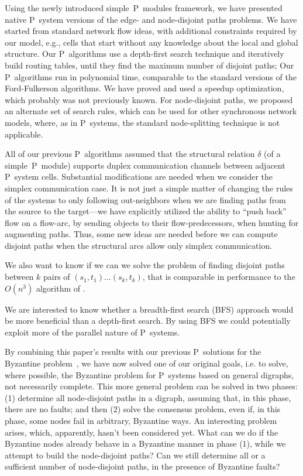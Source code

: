 \documentclass[preliminary,copyright,creativecommons]{eptcs}
\theoremstyle{remark}
\begin{document}
Using the newly introduced simple~P~modules framework,
we have presented native P~system versions 
of the edge- and node-disjoint paths problems.
We have started from standard network flow ideas,
with additional constraints required by our model,
e.g., cells that start without any knowledge about the local and global structure. 
Our P~algorithms use a depth-first search technique
and iteratively build routing tables, 
until they find the maximum number of disjoint paths;
Our P~algorithms run in polynomial time, 
comparable to the standard versions of the Ford-Fulkerson algorithms.   
We have proved and used a speedup optimization,
which probably was not previously known.
For node-disjoint paths, we proposed an alternate set of search rules, 
which can be used for other synchronous network models, where, as in P~systems, 
the standard node-splitting technique is not applicable.

All of our previous P~algorithms assumed that the structural relation $\delta$ 
(of a simple~P~module) 
supports duplex communication channels between adjacent P~system cells.  
Substantial modifications are needed when we consider the simplex communication case.  
It is not just a simple matter of changing the rules of the systems to 
only following out-neighbors when we are finding paths from the source 
to the target---we have explicitly utilized the ability to ``push back'' flow 
on a flow-arc, by sending objects to their flow-predecessors, 
when hunting for augmenting paths.  
Thus, some new ideas are needed before we can compute disjoint paths 
when the structural arcs allow only simplex communication.

We also want to know if we can we solve the problem of finding disjoint paths 
between $k$ pairs of $(s_1,t_1) \ldots (s_k,t_k)$, 
that is comparable in performance to the $O(n^3)$ algorithm of \cite{RobertsonS1995}.

We are interested to know whether a breadth-first search (BFS) approach
would be more beneficial than a depth-first search.  By using BFS we could
potentially exploit more of the parallel nature of P~systems. 

By combining this paper's results with our previous P~solutions
for the Byzantine problem~\cite{DKN-JLAP2010,DKN-CMC2010}, we have now solved one of our original goals, 
i.e. to solve, where possible, the Byzantine problem for P~systems
based on general digraphs, not necessarily complete. 
This more general problem can be solved in two phases:
(1) determine all node-disjoint paths in a digraph, 
assuming that, in this phase, there are no faults; and then 
(2) solve the consensus problem, even if, in this phase, 
some nodes fail in arbitrary, Byzantine ways.
An interesting problem arises, which, apparently, hasn't been considered yet.
What can we do if the Byzantine nodes already behave in a Byzantine manner 
in phase (1), while we attempt to build the node-disjoint paths?
Can we still determine all or a sufficient number of node-disjoint paths,
in the presence of Byzantine faults?
\end{document}
